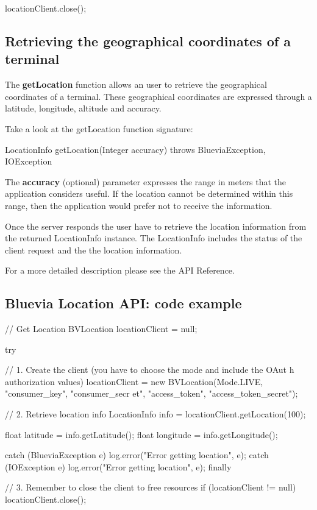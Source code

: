 \begin{DoxyCode}
locationClient.close();
\end{DoxyCode}
\hypertarget{blv_location_guide_retrieving_the_geographical_coordinates_of_a_terminal_sec}{}\subsection{Retrieving the geographical coordinates of a terminal}\label{blv_location_guide_retrieving_the_geographical_coordinates_of_a_terminal_sec}
The {\bfseries getLocation} function allows an user to retrieve the geographical coordinates of a terminal. These geographical coordinates are expressed through a latitude, longitude, altitude and accuracy.

Take a look at the getLocation function signature:


\begin{DoxyCode}
LocationInfo getLocation(Integer accuracy) throws BlueviaException, IOException
\end{DoxyCode}


The {\bfseries accuracy} (optional) parameter expresses the range in meters that the application considers useful. If the location cannot be determined within this range, then the application would prefer not to receive the information.

Once the server responds the user have to retrieve the location information from the returned LocationInfo instance. The LocationInfo includes the status of the client request and the the location information.

For a more detailed description please see the API Reference.\hypertarget{blv_location_guide_blv_location_api_code_example}{}\subsection{Bluevia Location API: code example}\label{blv_location_guide_blv_location_api_code_example}

\begin{DoxyCode}
// Get Location
BVLocation locationClient = null;

try {

        // 1. Create the client (you have to choose the mode and include the OAut
      h authorization values)
        locationClient = new BVLocation(Mode.LIVE, "consumer_key", "consumer_secr
      et", "access_token", "access_token_secret");

        // 2. Retrieve location info
        LocationInfo info = locationClient.getLocation(100);

        float latitude = info.getLatitude();
        float longitude = info.getLongitude();
                
} catch (BlueviaException e) {
        log.error("Error getting location", e);
} catch (IOException e) {
        log.error("Error getting location", e);
} finally {

        // 3. Remember to close the client to free resources
        if (locationClient != null)
                locationClient.close();
} 
\end{DoxyCode}
 